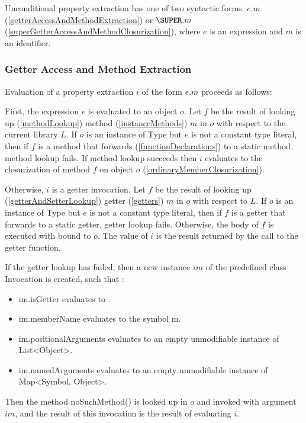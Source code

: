 \documentclass{article}
\newcommand{\code}[1]{{\sf #1}}
\begin{document}
\LMHash{}
Unconditional property extraction has one of two syntactic forms: $e.m$ (\ref{getterAccessAndMethodExtraction}) or $\SUPER.m$ (\ref{superGetterAccessAndMethodClosurization}), where $e$ is an expression and $m$ is an identifier.

\subsubsection{Getter Access and Method Extraction}

\LMHash{}
Evaluation of a property extraction $i$ of the form $e.m$ proceeds as follows:

\LMHash{}
First, the expression $e$ is evaluated to an object $o$. Let $f$ be the result of looking up (\ref{methodLookup}) method  (\ref{instanceMethods}) $m$ in $o$ with respect to the current library $L$.  If $o$ is an instance of \code{Type} but $e$ is not a constant type literal, then if $f$ is a method that forwards (\ref{functionDeclarations}) to a static method,  method lookup fails. If method lookup succeeds then $i$ evaluates to the closurization of method $f$ on object $o$ (\ref{ordinaryMemberClosurization}).


\LMHash{}
Otherwise, $i$ is a getter invocation.  Let $f$ be the result of looking up
(\ref{getterAndSetterLookup}) getter (\ref{getters}) $m$ in $o$  with respect to $L$. If $o$ is an instance of \code{Type} but $e$ is not a constant type literal, then if $f$ is a getter that forwards  to a static getter,  getter lookup fails. Otherwise, the body of $f$ is executed with \THIS{} bound to $o$.  The value of $i$ is the result returned by the call to the getter function.

\LMHash{}
If the getter lookup has failed, then a new instance $im$  of the predefined class \code{Invocation} is created, such that :
\begin{itemize}
\item \code{im.isGetter} evaluates to \code{\TRUE{}}.
\item \code{im.memberName} evaluates to the symbol \code{m}.
\item \code{im.positionalArguments} evaluates to an empty unmodifiable instance of \code{List<Object>}.
\item \code{im.namedArguments} evaluates to an empty unmodifiable instance of \code{Map<Symbol, Object>}.
\end{itemize}
Then the method \code{noSuchMethod()} is looked up in $o$ and invoked with argument $im$, and the result of this invocation is the result of evaluating $i$.
\end{document}
